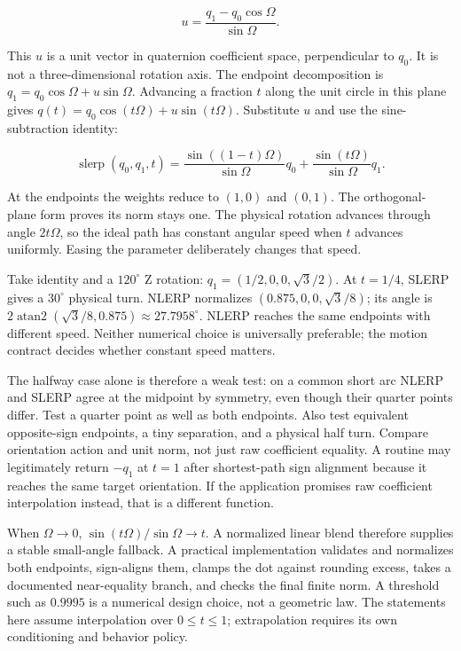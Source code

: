 \[
u=\frac{q_1-q_0\cos\Omega}{\sin\Omega}.
\]

This \(u\) is a unit vector in quaternion coefficient space, perpendicular to \(q_0\). It is not a three-dimensional rotation axis. The endpoint decomposition is \(q_1=q_0\cos\Omega+u\sin\Omega\). Advancing a fraction \(t\) along the unit circle in this plane gives \(q(t)=q_0\cos(t\Omega)+u\sin(t\Omega)\). Substitute \(u\) and use the sine-subtraction identity:

\[
\operatorname{slerp}(q_0,q_1,t)=
\frac{\sin((1-t)\Omega)}{\sin\Omega}q_0
+\frac{\sin(t\Omega)}{\sin\Omega}q_1.
\]

At the endpoints the weights reduce to \((1,0)\) and \((0,1)\). The orthogonal-plane form proves its norm stays one. The physical rotation advances through angle \(2t\Omega\), so the ideal path has constant angular speed when \(t\) advances uniformly. Easing the parameter deliberately changes that speed.

Take identity and a \(120^\circ\) Z rotation: \(q_1=(1/2,0,0,\sqrt3/2)\). At \(t=1/4\), SLERP gives a \(30^\circ\) physical turn. NLERP normalizes \((0.875,0,0,\sqrt3/8)\); its angle is \(2\operatorname{atan2}(\sqrt3/8,0.875)\approx27.7958^\circ\). NLERP reaches the same endpoints with different speed. Neither numerical choice is universally preferable; the motion contract decides whether constant speed matters.

The halfway case alone is therefore a weak test: on a common short arc NLERP and SLERP agree at the midpoint by symmetry, even though their quarter points differ. Test a quarter point as well as both endpoints. Also test equivalent opposite-sign endpoints, a tiny separation, and a physical half turn. Compare orientation action and unit norm, not just raw coefficient equality. A routine may legitimately return \(-q_1\) at \(t=1\) after shortest-path sign alignment because it reaches the same target orientation. If the application promises raw coefficient interpolation instead, that is a different function.

When \(\Omega\to0\), \(\sin(t\Omega)/\sin\Omega\to t\). A normalized linear blend therefore supplies a stable small-angle fallback. A practical implementation validates and normalizes both endpoints, sign-aligns them, clamps the dot against rounding excess, takes a documented near-equality branch, and checks the final finite norm. A threshold such as \(0.9995\) is a numerical design choice, not a geometric law. The statements here assume interpolation over \(0\le t\le1\); extrapolation requires its own conditioning and behavior policy.

